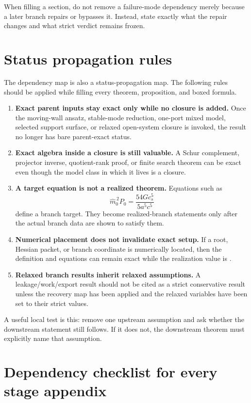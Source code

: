 When filling a section, do not remove a failure-mode dependency merely because a later branch repairs or bypasses it.  Instead, state exactly what the repair changes and what strict verdict remains frozen.

\section{Status propagation rules}
\label{sec:status-propagation-rules}

The dependency map is also a status-propagation map.  The following rules should be applied while filling every theorem, proposition, and boxed formula.

\begin{enumerate}[leftmargin=2.2em]
  \item \textbf{Exact parent inputs stay exact only while no closure is added.}  Once the moving-wall ansatz, stable-mode reduction, one-port mixed model, selected support surface, or relaxed open-system closure is invoked, the result no longer has bare parent-exact status.
  \item \textbf{Exact algebra inside a closure is still valuable.}  A Schur complement, projector inverse, quotient-rank proof, or finite search theorem can be exact even though the model class in which it lives is a closure.
  \item \textbf{A target equation is not a realized theorem.}  Equations such as
  \[
    \widehat m_0^{\,2}P_0=\frac{54Gc_s^5}{5a^5c^5}
  \]
  define a branch target.  They become realized-branch statements only after the actual branch data are shown to satisfy them.
  \item \textbf{Numerical placement does not invalidate exact setup.}  If a root, Hessian packet, or branch coordinate is numerically located, then the definition and equations can remain exact while the realization value is \StatusNumerical.
  \item \textbf{Relaxed branch results inherit relaxed assumptions.}  A leakage/work/export result should not be cited as a strict conservative result unless the recovery map has been applied and the relaxed variables have been set to their strict values.
\end{enumerate}

A useful local test is this: remove one upstream assumption and ask whether the downstream statement still follows.  If it does not, the downstream theorem must explicitly name that assumption.

\section{Dependency checklist for every stage appendix}
\label{sec:stage-appendix-dependency-checklist}

